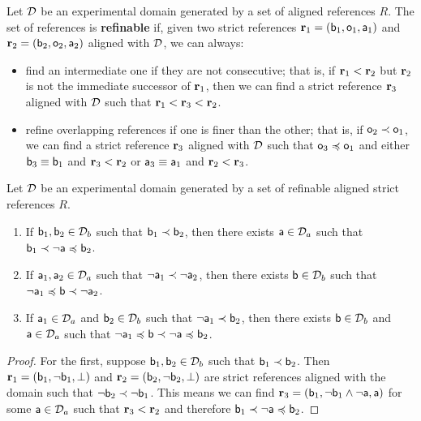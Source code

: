 \documentclass[11pt,letterpaper,fleqn]{memoir} %
\begin{document}
\begin{mathSection}
\begin{defn}
	Let $\edomain$ be an experimental domain generated by a set of aligned references $R$. The set of references is \textbf{refinable} if, given two strict references $\refStmt_1 = ( \stmt[b]_1, \stmt[o]_1, \stmt[a]_1)$ and $\refStmt_2 = ( \stmt[b]_2, \stmt[o]_2, \stmt[a]_2)$ aligned with $\edomain$, we can always:
	\begin{itemize}
		\item find an intermediate one if they are not consecutive; that is, if $\refStmt[r]_1 < \refStmt[r]_2$ but $\refStmt[r]_2$ is not the immediate successor of $\refStmt[r]_1$, then we can find a strict reference $\refStmt_3$ aligned with $\edomain$ such that $\refStmt[r]_1 < \refStmt[r]_3 < \refStmt[r]_2$.
		\item refine overlapping references if one is finer than the other; that is, if $\stmt[o]_2 \snarrower \stmt[o]_1$, we can find a strict reference $\refStmt_3$ aligned with $\edomain$ such that $\stmt[o]_3 \narrower \stmt[o]_1$ and either $\stmt[b]_3 \equiv \stmt[b]_1$ and $\refStmt_3 < \refStmt_2$ or $\stmt[a]_3 \equiv \stmt[a]_1$ and $\refStmt_2 < \refStmt_3$.
	\end{itemize}
\end{defn}

\begin{prop}\label{3_prop_refinable_order_sequences}
	Let $\edomain$ be an experimental domain generated by a set of refinable aligned strict references $R$.
	\begin{enumerate}
		\item If $\stmt[b]_1, \stmt[b]_2 \in \edomain_b$ such that $\stmt[b]_1 \snarrower \stmt[b]_2$, then there exists $\stmt[a] \in \edomain_a$ such that $\stmt[b]_1 \snarrower \NOT \stmt[a] \narrower \stmt[b]_2$.
		\item If $\stmt[a]_1, \stmt[a]_2 \in \edomain_a$ such that $\NOT \stmt[a]_1 \snarrower \NOT \stmt[a]_2$, then there exists $\stmt[b] \in \edomain_b$ such that $\NOT \stmt[a]_1 \narrower \stmt[b] \snarrower \NOT \stmt[a]_2$.
		\item If $\stmt[a]_1 \in \edomain_a$ and $\stmt[b]_2\in \edomain_b$ such that $\NOT \stmt[a]_1 \snarrower \stmt[b]_2$, then there exists $\stmt[b] \in \edomain_b$ and $\stmt[a] \in \edomain_a$ such that $\NOT \stmt[a]_1 \narrower \stmt[b] \snarrower \NOT \stmt[a] \narrower \stmt[b]_2$.
	\end{enumerate}
\end{prop}
\begin{proof}
	For the first, suppose $\stmt[b]_1, \stmt[b]_2 \in \edomain_b$ such that $\stmt[b]_1 \snarrower \stmt[b]_2$. Then $\refStmt_1 = ( \stmt[b]_1, \NOT \stmt[b]_1, \impossibility )$ and  $\refStmt_2 = ( \stmt[b]_2, \NOT \stmt[b]_2, \impossibility)$ are strict references aligned with the domain such that $\NOT \stmt[b]_2 \snarrower \NOT \stmt[b]_1$. This means we can find $\refStmt_3 = ( \stmt[b]_1, \NOT \stmt[b]_1 \AND \NOT \stmt[a], \stmt[a] )$ for some $\stmt[a] \in \edomain_a$ such that $\refStmt_3 < \refStmt_2$ and therefore $\stmt[b]_1 \snarrower \NOT \stmt[a] \narrower \stmt[b]_2$.
	

\end{proof}
\end{mathSection}
\end{document}
